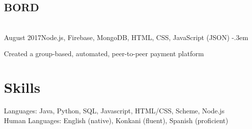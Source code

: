 \documentclass{article}
\let\olditemize=\itemize \let\endolditemize=\enditemize
\renewenvironment{itemize}{\olditemize[topsep=0em] \itemsep-.3em}{\endolditemize}
\newcommand{\entry}[3]{\quad\textbf{#1}\\#2\qquad#3}
\begin{document}
\subsection{BORD}
\entry{}{August 2017}{Node.js, Firebase, MongoDB, HTML, CSS, JavaScript (JSON)}
\begin{itemize}
  \item Created a group-based, automated, peer-to-peer payment platform
\end{itemize}



\section{Skills}
Languages:
  Java, Python, SQL, Javascript, HTML/CSS, Scheme, Node.js \\
Human Languages:
  English (native), Konkani (fluent), Spanish (proficient)
\end{document}
